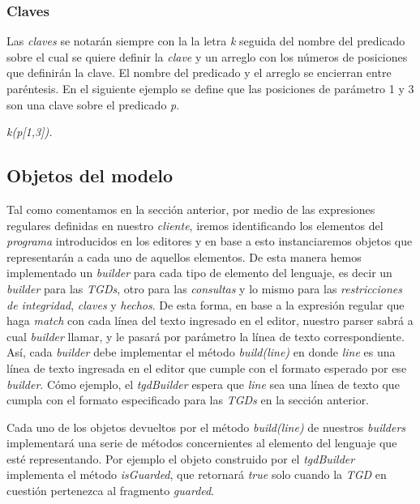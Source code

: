 \documentclass[11pt,a4paper,twoside]{tesis}
\begin{document}
\subsubsection{Claves}

Las \textit{claves} se notarán siempre con la la letra \textit{k} seguida del nombre del predicado sobre el cual se quiere definir la \textit{clave} y un arreglo con los números de posiciones que definirán la clave. El nombre del predicado y el arreglo se encierran entre paréntesis. En el siguiente ejemplo se define que las posiciones de parámetro 1 y 3 son una clave sobre el predicado \textit{p}.

\begin{center}
 \textit{k(p[1,3]).}
\end{center}

\subsection{Objetos del modelo}\label{objetos_javascript}

Tal como comentamos en la sección anterior, por medio de las expresiones regulares definidas en nuestro \textit{cliente}, iremos identificando los elementos del \textit{programa} introducidos en los editores y en base a esto instanciaremos objetos que representarán a cada uno de aquellos elementos. De esta manera hemos implementado un \textit{builder} para cada tipo de elemento del lenguaje, es decir un \textit{builder} para las \textit{TGDs}, otro para las \textit{consultas} y lo mismo para las \textit{restricciones de integridad}, \textit{claves} y \textit{hechos}. De esta forma, en base a la expresión regular que haga \textit{match} con cada línea del texto ingresado en el editor, nuestro parser sabrá a cual \textit{builder} llamar, y le pasará por parámetro la línea de texto correspondiente. Así, cada \textit{builder} debe implementar el método \textit{build(line)} en donde \textit{line} es una línea de texto ingresada en el editor que cumple con el formato esperado por ese \textit{builder}. Cómo ejemplo, el \textit{tgdBuilder} espera que \textit{line} sea una línea de texto que cumpla con el formato especificado para las \textit{TGDs} en la sección anterior.

Cada uno de los objetos devueltos por el método \textit{build(line)} de nuestros \textit{builders} implementará una serie de métodos concernientes al elemento del lenguaje que esté representando. Por ejemplo el objeto construido por el \textit{tgdBuilder} implementa el método \textit{isGuarded}, que retornará \textit{true} solo cuando la \textit{TGD} en cuestión pertenezca al fragmento \textit{guarded}.
\end{document}

